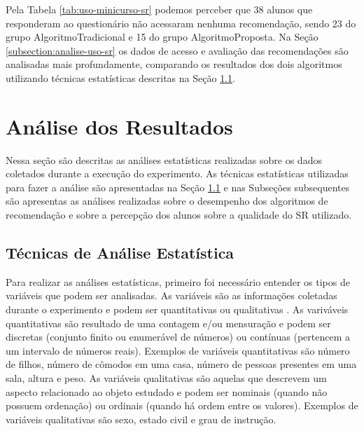 Pela Tabela \ref{tab:uso-minicurso-sr} podemos perceber que 38 alunos que responderam ao questionário não acessaram nenhuma
recomendação, sendo 23 do grupo AlgoritmoTradicional e 15 do grupo AlgoritmoProposta. Na Seção
\ref{subsection:analise-uso-sr} os dados de acesso e avaliação das recomendações são analisadas mais profundamente,
comparando os resultados dos dois algoritmos utilizando técnicas estatísticas descritas na Seção \ref{subsection:tecnicas-analise-estatistica}.

\section{Análise dos Resultados}\label{section:analise-experimento}

Nessa seção são descritas as análises estatísticas realizadas sobre os dados coletados durante a execução do experimento.
As técnicas estatísticas utilizadas para fazer a análise são apresentadas na Seção \ref{subsection:tecnicas-analise-estatistica}
e nas Subseções subsequentes são apresentas as análises realizadas sobre o desempenho dos algoritmos de recomendação e sobre
a percepção dos alunos sobre a qualidade do SR utilizado.

\subsection{Técnicas de Análise Estatística}\label{subsection:tecnicas-analise-estatistica}

Para realizar as análises estatísticas, primeiro foi necessário entender os tipos de variáveis que podem ser analisadas.
As variáveis são as informações coletadas durante o experimento e podem ser quantitativas ou qualitativas \cite{bussab2012morettin}.
As variváveis quantitativas são resultado de uma contagem e/ou mensuração \cite{bussab2012morettin} e podem ser discretas
(conjunto finito ou enumerável de números) ou contínuas (pertencem a um intervalo de números reais). Exemplos de variáveis
quantitativas são número de filhos, número de cômodos em uma casa, número de pessoas presentes em uma sala, altura e peso.
As variáveis qualitativas são aquelas que descrevem um aspecto relacionado ao objeto estudado \cite{bussab2012morettin} e podem ser
nominais (quando não possuem ordenação) ou ordinais (quando há ordem entre os valores). Exemplos de variáveis qualitativas
são sexo, estado civil e grau de instrução.

